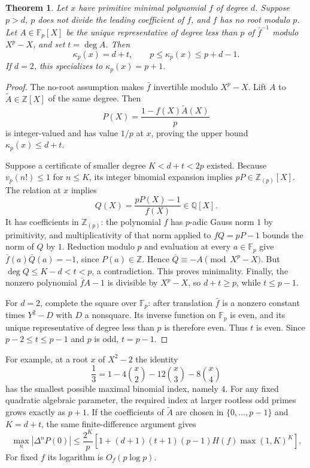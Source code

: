 \documentclass[11pt,a4paper]{article}
\newcommand{\Q}{\mathbb Q}
\newcommand{\Z}{\mathbb Z}
\newtheorem{theorem}{Theorem}[section]
\theoremstyle{definition}
\theoremstyle{remark}
\theoremstyle{plain}
\numberwithin{equation}{section}
\begin{document}
\begin{theorem}\label{em:pu:thm:minimum}
Let $x$ have primitive minimal polynomial $f$ of degree $d$.
Suppose $p>d$, $p$ does not divide the leading coefficient of $f$,
and $f$ has no root modulo $p$.  Let $A\in\mathbb F_p[X]$ be
the unique representative of degree less than $p$ of
$\bar f^{-1}$ modulo $X^p-X$, and set $t=\deg A$.  Then
\[
 \kappa_p(x)=d+t,\qquad p\le\kappa_p(x)\le p+d-1.
\]
If $d=2$, this specializes to $\kappa_p(x)=p+1$.
\end{theorem}
\begin{proof}
The no-root assumption makes $\bar f$ invertible modulo $X^p-X$.
Lift $A$ to $\widetilde A\in\Z[X]$ of the same degree.  Then
\[
 P(X)=\frac{1-f(X)\widetilde A(X)}p
\]
is integer-valued and has value $1/p$ at $x$, proving the upper
bound $\kappa_p(x)\le d+t$.

Suppose a certificate of smaller degree $K<d+t<2p$ existed.
Because $v_p(n!)\le1$ for $n\le K$, its integer binomial expansion
implies $pP\in\Z_{(p)}[X]$.  The relation at $x$ implies
\[
 Q(X)=\frac{pP(X)-1}{f(X)}\in\Q[X].
\]
It has coefficients in $\Z_{(p)}$: the polynomial $f$ has
$p$-adic Gauss norm $1$ by primitivity, and multiplicativity
of that norm applied to $fQ=pP-1$ bounds the norm of $Q$ by $1$.
Reduction modulo $p$ and evaluation at every $a\in\mathbb F_p$
give $\bar f(a)\bar Q(a)=-1$, since $P(a)\in\Z$.
Hence $\bar Q\equiv-A\pmod{X^p-X}$.  But
$\deg Q\le K-d<t<p$, a contradiction.  This proves minimality.
Finally, the nonzero polynomial $\bar f A-1$ is divisible by
$X^p-X$, so $d+t\ge p$, while $t\le p-1$.

For $d=2$, complete the square over $\mathbb F_p$:
after translation $\bar f$ is a nonzero constant times $Y^2-D$
with $D$ a nonsquare.  Its inverse function on $\mathbb F_p$
is even, and its unique representative of degree less than $p$
is therefore even.  Thus $t$ is even.  Since
$p-2\le t\le p-1$ and $p$ is odd, $t=p-1$.
\end{proof}

For example, at a root $x$ of $X^2-2$ the identity
\[
 \frac13=1-4\binom x2-12\binom x3-8\binom x4
\]
has the smallest possible maximal binomial index, namely $4$.
For any fixed quadratic algebraic parameter, the required index
at larger rootless odd primes grows exactly as $p+1$.
If the coefficients of $\widetilde A$ are chosen in
$\{0,\ldots,p-1\}$ and $K=d+t$, the same finite-difference
argument gives
\[
 \max_n|\Delta^nP(0)|\le\frac{2^K}{p}
 \left[1+(d+1)(t+1)(p-1)H(f)\max(1,K)^K\right].
\]
For fixed $f$ its logarithm is $O_f(p\log p)$.
\end{document}
